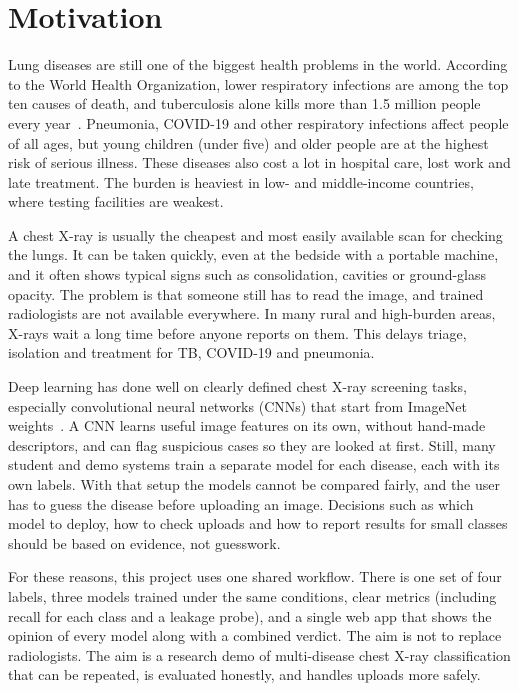 
\section{Motivation}

Lung diseases are still one of the biggest health problems in the world. According to the World Health Organization, lower respiratory infections are among the top ten causes of death, and tuberculosis alone kills more than 1.5 million people every year~\cite{who2023}. Pneumonia, COVID-19 and other respiratory infections affect people of all ages, but young children (under five) and older people are at the highest risk of serious illness. These diseases also cost a lot in hospital care, lost work and late treatment. The burden is heaviest in low- and middle-income countries, where testing facilities are weakest.

A chest X-ray is usually the cheapest and most easily available scan for checking the lungs. It can be taken quickly, even at the bedside with a portable machine, and it often shows typical signs such as consolidation, cavities or ground-glass opacity. The problem is that someone still has to read the image, and trained radiologists are not available everywhere. In many rural and high-burden areas, X-rays wait a long time before anyone reports on them. This delays triage, isolation and treatment for TB, COVID-19 and pneumonia.

Deep learning has done well on clearly defined chest X-ray screening tasks, especially convolutional neural networks (CNNs) that start from ImageNet weights~\cite{deng2009}. A CNN learns useful image features on its own, without hand-made descriptors, and can flag suspicious cases so they are looked at first. Still, many student and demo systems train a separate model for each disease, each with its own labels. With that setup the models cannot be compared fairly, and the user has to guess the disease before uploading an image. Decisions such as which model to deploy, how to check uploads and how to report results for small classes should be based on evidence, not guesswork.

For these reasons, this project uses one shared workflow. There is one set of four labels, three models trained under the same conditions, clear metrics (including recall for each class and a leakage probe), and a single web app that shows the opinion of every model along with a combined verdict. The aim is not to replace radiologists. The aim is a research demo of multi-disease chest X-ray classification that can be repeated, is evaluated honestly, and handles uploads more safely.

